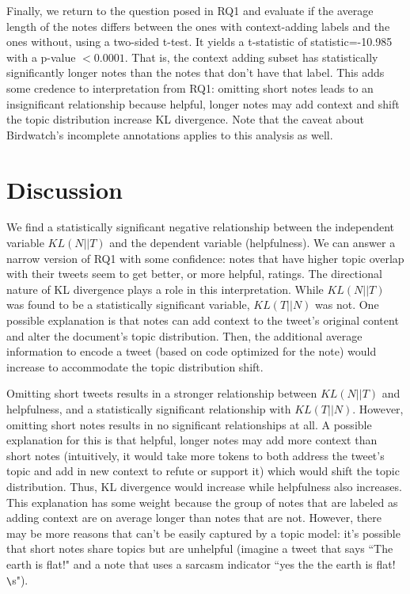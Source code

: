 \documentclass [11pt, proquest] {uwthesis}[2020/02/24]
\begin{document}


Finally,  we return to the question posed in RQ1 and evaluate if the average length of the notes differs between the ones with context-adding  labels and the ones without, using a two-sided t-test. It yields a t-statistic of statistic=-10.985 with a p-value $< 0.0001$. That is, the context adding subset has statistically significantly longer notes than the notes that don’t have that label. This adds some credence to interpretation from RQ1: omitting short notes leads to an insignificant relationship because helpful, longer notes may add context and shift the topic distribution increase KL divergence. Note that the caveat about Birdwatch's incomplete annotations applies to this analysis as well.

\chapter{Discussion}

We find a statistically significant negative relationship between the independent variable $KL(N || T)$ and the dependent variable (helpfulness). We can answer a narrow version of RQ1 with some confidence: notes that have higher topic overlap with their tweets seem to get better, or more helpful, ratings. The directional nature of KL divergence plays a role in this interpretation. While $KL(N || T)$ was found to be a statistically significant variable, $KL(T || N)$ was not. One possible explanation is that notes can add context to the tweet’s original content and alter the document’s topic distribution. Then, the additional average information to encode a tweet (based on code optimized for the note) would increase to accommodate the topic distribution shift.

Omitting short tweets results in a stronger relationship between $KL(N || T)$ and helpfulness, and a statistically significant relationship with $KL(T || N)$. However, omitting short notes results in no significant relationships at all. A possible explanation for this is that helpful, longer notes may add more context than short notes (intuitively, it would take more tokens to both address the tweet’s topic and add in new context to refute or support it) which would shift the topic distribution. Thus, KL divergence would increase while helpfulness also increases. This explanation has some weight because the group of notes that are labeled as adding context are on average longer than notes that are not. However, there may be more reasons that can’t be easily captured by a topic model: it’s possible that short notes share topics but are unhelpful (imagine a tweet that says ``The earth is flat!" and a note that uses a sarcasm indicator ``yes the the earth is flat! \verb|\|s").
\end{document}
